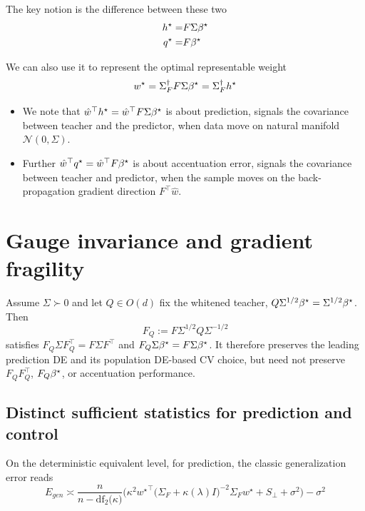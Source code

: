 The key notion is the difference between these two
\begin{align*}
h^{\star}= & F\Sigma{\beta^{\star}}\\
q^{\star}= & F{\beta^{\star}}
\end{align*}

We can also use it to represent the optimal representable weight
\[
w^{\star}=\Sigma_{F}^{\dagger}F\Sigma{\beta^{\star}}=\Sigma_{F}^{\dagger}h^{\star}
\]

\begin{itemize}
\item We note that $\hat{w}^{\top}h^{\star}=\hat{w}^{\top}F\Sigma{\beta^{\star}}$
is about prediction, signals the covariance between teacher and the
predictor, when data move on natural manifold $\mathcal{N}(0,\Sigma)$.
\item Further $\hat{w}^{\top}q^{\star}=\hat{w}^{\top}F{\beta^{\star}}$ is
about accentuation error, signals the covariance between teacher and
predictor, when the sample moves on the back-propagation gradient
direction $F^{\top}\hat{w}$.
\end{itemize}



\section{Gauge invariance and gradient fragility}\label{sec:app-gauge-fragility}

\begingroup\color{red}
\begin{proposition}
\label{prop:app-feature-gauge}
Assume $\Sigma\succ0$ and let $Q\in O(d)$ fix the whitened teacher,
$Q\Sigma^{1/2}{\beta^{\star}}=\Sigma^{1/2}{\beta^{\star}}$.  Then
\begin{equation}
F_Q:=F\Sigma^{1/2}Q\Sigma^{-1/2}
\end{equation}
satisfies $F_Q\Sigma F_Q^\top=F\Sigma F^\top$ and
$F_Q\Sigma{\beta^{\star}}=F\Sigma{\beta^{\star}}$.  It therefore preserves the leading
prediction DE and its population DE-based CV choice, but need not preserve
$F_QF_Q^\top$, $F_Q{\beta^{\star}}$, or accentuation performance.
\end{proposition}
\endgroup

\subsection{Distinct sufficient statistics for prediction and control}

On the deterministic equivalent level, for prediction, the classic
generalization error reads
\[
E_{gen}\asymp\frac{n}{n-\mathrm{df}_{2}\bigl(\kappa\bigr)}\Big(\kappa^{2}{w^\star}^{\top}\bigl(\Sigma_{F}+\kappa(\lambda)I\bigr)^{-2}\Sigma_{F}w^{\star}+S_{\perp}+\sigma^{2}\Big)-\sigma^{2}
\]

